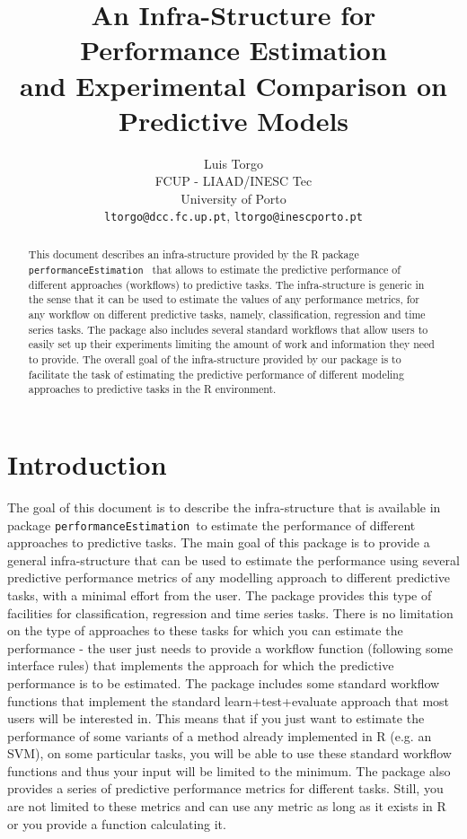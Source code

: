 \documentclass[10pt,a4paper]{article}\usepackage[]{graphicx}\usepackage[]{color}
\author{Luis Torgo\\FCUP - LIAAD/INESC Tec\\University of Porto\\
  \texttt{ltorgo@dcc.fc.up.pt}, \texttt{ltorgo@inescporto.pt}}
\title{An Infra-Structure for Performance Estimation\\ and Experimental Comparison on Predictive Models}
\newcommand{\PE}{package \texttt{performanceEstimation}\ }
\begin{document}
\maketitle

\begin{abstract}
  
  This document describes an infra-structure provided by the R \PE
  that allows to estimate the predictive performance of different
  approaches (workflows) to predictive tasks.  The infra-structure is
  generic in the sense that it can be used to estimate the values of
  any performance metrics, for any workflow on different predictive
  tasks, namely, classification, regression and time series tasks. The
  package also includes several standard workflows that allow users to
  easily set up their experiments limiting the amount of work and
  information they need to provide. The overall goal of the
  infra-structure provided by our package is to facilitate the task of
  estimating the predictive performance of different modeling
  approaches to predictive tasks in the R environment.
   
\end{abstract}

\section{Introduction}

The goal of this document is to describe the infra-structure that is
available in \PE to estimate the performance of different approaches
to predictive tasks.  The main goal of this package is to provide a
general infra-structure that can be used to estimate the performance
using several predictive performance metrics of any modelling approach
to different predictive tasks, with a minimal effort from the
user. The package provides this type of facilities for classification,
regression and time series tasks. There is no limitation on the type
of approaches to these tasks for which you can estimate the
performance - the user just needs to provide a workflow function
(following some interface rules) that implements the approach for
which the predictive performance is to be estimated. The package
includes some standard workflow functions that implement the standard
learn+test+evaluate approach that most users will be interested
in. This means that if you just want to estimate the performance of
some variants of a method already implemented in R (e.g. an SVM), on
some particular tasks, you will be able to use these standard workflow
functions and thus your input will be limited to the minimum. The
package also provides a series of predictive performance metrics for
different tasks. Still, you are not limited to these metrics and can
use any metric as long as it exists in R or you provide a function
calculating it.
\end{document}
